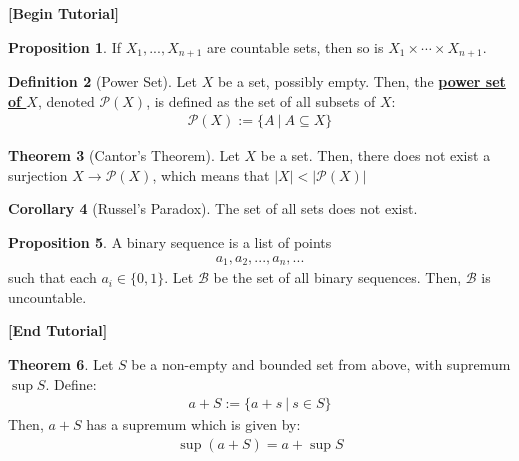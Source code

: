 \documentclass[reqno,11pt]{amsart}
\theoremstyle{definition}
\newtheorem{theorem}{Theorem}
\newtheorem{prop}[theorem]{Proposition}
\newtheorem{corollary}[theorem]{Corollary}
\theoremstyle{definition}
\newtheorem{definition}[theorem]{Definition}
\theoremstyle{remark}
\newcommand{\dfn}[1]{\underline{\textbf{#1}}}
\begin{document}
\begin{center}
	\textbf{[Begin Tutorial]}
\end{center}
\begin{prop}
	If $X_1, ..., X_{n+1}$ are countable sets, then so is $X_1 \times \cdots \times X_{n+1}$.
\end{prop}

\begin{definition}[Power Set]
	Let $X$ be a set, possibly empty. Then, the \dfn{power set of $X$}, denoted $\mathcal{P}(X)$, is defined as the set of all subsets of $X$:
	\begin{align}
		\mathcal{P}(X) := \{ A\ |\ A \subseteq X \}	
	\end{align}
\end{definition}

\begin{theorem}[Cantor's Theorem]
	Let $X$ be a set. Then, there does not exist a surjection $X \rightarrow \mathcal{P}(X)$, which means that $|X| < | \mathcal{P}(X) | $
\end{theorem}

\begin{corollary}[Russel's Paradox]
	The set of all sets does not exist.
\end{corollary}

\begin{prop}
	A binary sequence is a list of points
		\begin{align*}
			a_1, a_2, ..., a_n , ...
		\end{align*}
		such that each $a_i \in \{ 0, 1\}$. Let $\mathcal{B}$ be the set of all binary sequences. Then, $\mathcal{B}$ is uncountable.
\end{prop}

\begin{center}
	\textbf{[End Tutorial]}
\end{center}


\begin{theorem}
	Let $S$ be a non-empty and bounded set from above, with supremum $\sup{S} $. Define: 
	\begin{align*}
		a + S := \{ a + s\ |\ s \in S \}
	\end{align*}
	Then, $a+S$ has a supremum which is given by: 
	\begin{align}
		\sup{(a+S)} = a + \sup{S} 	
	\end{align}
\end{theorem}
\end{document}
